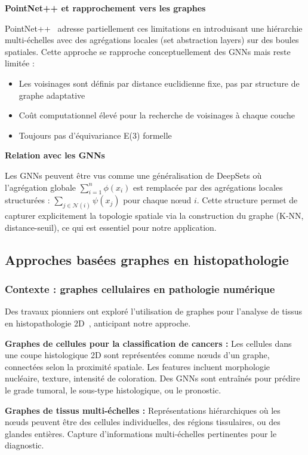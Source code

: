 \textbf{PointNet++ et rapprochement vers les graphes}

PointNet++~\cite{Qi2017b} adresse partiellement ces limitations en introduisant une hiérarchie multi-échelles avec des agrégations locales (set abstraction layers) sur des boules spatiales. Cette approche se rapproche conceptuellement des GNNs mais reste limitée :
\begin{itemize}
    \item Les voisinages sont définis par distance euclidienne fixe, pas par structure de graphe adaptative
    \item Coût computationnel élevé pour la recherche de voisinages à chaque couche
    \item Toujours pas d'équivariance E(3) formelle
\end{itemize}

\textbf{Relation avec les GNNs}

Les GNNs peuvent être vus comme une généralisation de DeepSets où l'agrégation globale $\sum_{i=1}^n \phi(x_i)$ est remplacée par des agrégations locales structurées : $\sum_{j \in \mathcal{N}(i)} \psi(x_j)$ pour chaque nœud $i$. Cette structure permet de capturer explicitement la topologie spatiale via la construction du graphe (K-NN, distance-seuil), ce qui est essentiel pour notre application.

\subsection{Approches basées graphes en histopathologie}

\subsubsection{Contexte : graphes cellulaires en pathologie numérique}

Des travaux pionniers ont exploré l'utilisation de graphes pour l'analyse de tissus en histopathologie 2D~\cite{Zhou2019,Jaume2021,Pati2022}, anticipant notre approche.

\textbf{Graphes de cellules pour la classification de cancers :}
Les cellules dans une coupe histologique 2D sont représentées comme nœuds d'un graphe, connectées selon la proximité spatiale. Les features incluent morphologie nucléaire, texture, intensité de coloration. Des GNNs sont entraînés pour prédire le grade tumoral, le sous-type histologique, ou le pronostic.

\textbf{Graphes de tissus multi-échelles :}
Représentations hiérarchiques où les nœuds peuvent être des cellules individuelles, des régions tissulaires, ou des glandes entières. Capture d'informations multi-échelles pertinentes pour le diagnostic.

